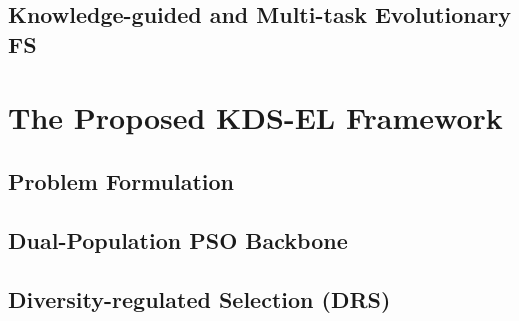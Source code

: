 \subsection{Knowledge-guided and Multi-task Evolutionary FS}



\section{The Proposed KDS-EL Framework}

\subsection{Problem Formulation}

\subsection{Dual-Population PSO Backbone}

\subsection{Diversity-regulated Selection (DRS)}
%
%
%
%
%

